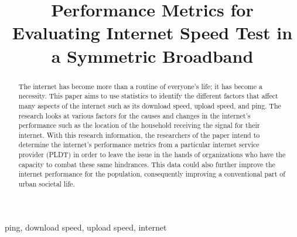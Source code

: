 \documentclass[conference]{IEEEtran}
\begin{document}
\title{Performance Metrics for Evaluating Internet Speed Test in a Symmetric Broadband\\
}

\author{
\and
{}
}

\maketitle

\begin{abstract}
	The internet has become more than a routine of everyone's life; 
    it has become a necessity. This paper aims to use statistics to identify the different factors that affect many aspects of the internet such as its download speed, upload speed, and ping. 
    The research looks at various factors for the causes and changes in the internet's performance such as the location of the household receiving the signal for their internet. 
    With this research information, the researchers of the paper intend to determine the internet's performance metrics from a particular internet service provider (PLDT) in order to leave the issue in the hands of organizations who have the capacity to combat these same hindrances. 
    This data could also further improve the internet performance for the population, consequently improving a conventional part of urban societal life.
\end{abstract}

\begin{IEEEkeywords}
ping, download speed, upload speed, internet
\end{IEEEkeywords}
\end{document}

